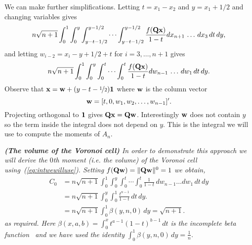 \documentclass[draftcls, onecolumn, 11pt]{IEEEtran}
\begin{document}
We can make further simplifications.  Letting $t = x_1 - x_2$ and $y = x_1 + 1/2$ and changing variables gives
\[
n \sqrt{n+1} \int^{1}_{0} \int^{y}_{0}  \int^{y - 1/2}_{y - t - 1/2} \cdots \int^{y-1/2}_{y-t-1/2} \frac{f(\mathbf{Q}\mathbf{x} )}{1 - t}  dx_{n+1} \, \dots \, dx_3 \, dt \, dy,
\]
and letting $w_{i-2} = x_i - y + 1/2 + t$ for $i = 3,\dots,n+1$ gives
\begin{equation}\label{eq:intwewilluse}
n \sqrt{n+1} \int^{1}_{0} \int^{y}_{0}  \int^{t}_{0} \cdots \int^{t}_{0} \frac{f(\Qbf\xbf )}{1 - t}  dw_{n-1} \, \dots \, dw_1 \, dt \, dy.
\end{equation}
Observe that $\mathbf{x} = \mathbf{w} + (y - t - \nicefrac{1}{2})\boldsymbol{1}$ where $\mathbf{w}$ is the column vector
\[
\mathbf{w} = [t, 0, w_1, w_2, \dots, w_{n-1}]^\prime.
\]
Projecting orthogonal to $\boldsymbol{1}$ gives $\mathbf{Q}\mathbf{x} = \mathbf{Q} \mathbf{w}$.  Interestingly $\mathbf{w}$ does not contain $y$ so the term inside the integral does not depend on $y$.  This is the integral we will use to compute the moments of $A_n$.

\begin{example}\emph{\textbf{(The volume of the Voronoi cell)}
In order to demonstrate this approach we will derive the $0$th moment (i.e. the volume) of the Voronoi cell using~(\ref{eq:intwewilluse}).  Setting $f(\mathbf{Q}\mathbf{w}) = \|\mathbf{Q}\mathbf{w}\|^0 = 1$ we obtain,
\begin{align*}
C_0 &= n\sqrt{n+1} \int^{1}_{0} \int^{y}_{0} \int^{t}_{0} \cdots \int^{t}_{0} \frac{1}{1 - t} \,dw_{n-1}\dots dw_1 \, dt  \, dy\\
 &= n\sqrt{n+1} \int^{y}_{0} \int_{0}^{1}  \frac{t^{n-1}}{1 - t} \, dt  \, dy. \\
&= n\sqrt{n+1}  \int^{1}_{0} \beta(y, n, 0) \, dy = \sqrt{n+1}.
\end{align*}
as required.  Here $\beta(x,a,b) =  \int_{0}^{x}  t^{a-1}(1 - t)^{b-1} \,dt$ is the incomplete beta function~\cite{Pearson_tables_of_beta_functions} and we have used the identity $\int^{1}_{0} \beta(y, n, 0) \, dy = \frac{1}{n}$.}
\end{example}

\end{document}
